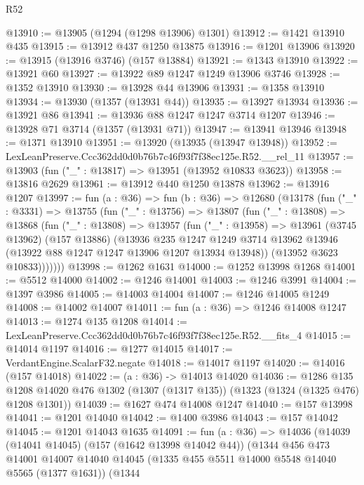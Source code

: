 \begin{lexlean}{R52}
\begin{coremodule}
@13910 := @13905 (@1294 (@1298 @13906) @1301)
@13912 := @1421 @13910 @435
@13915 := @13912 @437 @1250 @13875
@13916 := @1201 @13906
@13920 := @13915 (@13916 @3746) (@157 @13884)
@13921 := @1343 @13910
@13922 := @13921 @60
@13927 := @13922 @89 @1247 @1249 @13906 @3746
@13928 := @1352 @13910
@13930 := @13928 @44 @13906
@13931 := @1358 @13910
@13934 := @13930 (@1357 (@13931 @44))
@13935 := @13927 @13934
@13936 := @13921 @86
@13941 := @13936 @88 @1247 @1247 @3714 @1207
@13946 := @13928 @71 @3714 (@1357 (@13931 @71))
@13947 := @13941 @13946
@13948 := @1371 @13910
@13951 := @13920 (@13935 (@13947 @13948))
@13952 := LexLeanPreserve.Ccc362dd0d0b76b7c46f93f7f38ec125e.R52.__rel_11
@13957 := @13903 (fun ("_" : @13817) => @13951 (@13952 @10833 @3623))
@13958 := @13816 @2629
@13961 := @13912 @440 @1250 @13878
@13962 := @13916 @1207
@13997 := fun (a : @36) =>
  fun (b : @36) =>
  @12680
    (@13178
      (fun ("_" : @3331) =>
      @13755
        (fun ("_" : @13756) =>
        @13807
          (fun ("_" : @13808) =>
          @13868
            (fun ("_" : @13808) =>
            @13957
              (fun ("_" : @13958) =>
              @13961
                (@3745 @13962)
                (@157 @13886)
                (@13936
                  @235
                  @1247
                  @1249
                  @3714
                  @13962
                  @13946
                  (@13922 @88 @1247 @1247 @13906 @1207 @13934 @13948))
                (@13952 @3623 @10833)))))))
@13998 := @1262 @1631
@14000 := @1252 @13998 @1268
@14001 := @5512 @14000
@14002 := @1246 @14001
@14003 := @1246 @3991
@14004 := @1397 @3986
@14005 := @14003 @14004
@14007 := @1246 @14005 @1249
@14008 := @14002 @14007
@14011 := fun (a : @36) => @1246 @14008 @1247
@14013 := @1274 @135 @1208
@14014 := LexLeanPreserve.Ccc362dd0d0b76b7c46f93f7f38ec125e.R52.__fits_4
@14015 := @14014 @1197
@14016 := @1277 @14015
@14017 := VerdantEngine.ScalarF32.negate
@14018 := @14017 @1197
@14020 := @14016 (@157 @14018)
@14022 := (a : @36) -> @14013 @14020
@14036 := @1286
    @135
    @1208
    @14020
    @476
    @1302
    (@1307 (@1317 @135))
    (@1323 (@1324 (@1325 @476) @1208 @1301))
@14039 := @1627 @474 @14008 @1247
@14040 := @157 @13998
@14041 := @1201 @14040
@14042 := @1400 @3986
@14043 := @157 @14042
@14045 := @1201 @14043 @1635
@14091 := fun (a : @36) =>
  @14036
    (@14039
      (@14041 @14045)
      (@157 (@1642 @13998 @14042 @44))
      (@1344
        @456
        @473
        @14001
        @14007
        @14040
        @14045
        (@1335 @455 @5511 @14000 @5548 @14040 @5565 (@1377 @1631))
        (@1344

\end{coremodule}
\end{lexlean}

